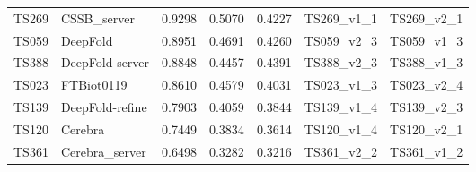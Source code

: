 \begin{table}[ht]
{\begin{tabular}{llrrrll}
TS269 & CSSB\_server & 0.9298 & 0.5070 & 0.4227 & TS269\_v1\_1 & TS269\_v2\_1 \\ 
TS059 & DeepFold & 0.8951 & 0.4691 & 0.4260 & TS059\_v2\_3 & TS059\_v1\_3 \\ 
TS388 & DeepFold-server & 0.8848 & 0.4457 & 0.4391 & TS388\_v2\_3 & TS388\_v1\_3 \\ 
TS023 & FTBiot0119 & 0.8610 & 0.4579 & 0.4031 & TS023\_v1\_3 & TS023\_v2\_4 \\ 
TS139 & DeepFold-refine & 0.7903 & 0.4059 & 0.3844 & TS139\_v1\_4 & TS139\_v2\_3 \\ 
TS120 & Cerebra & 0.7449 & 0.3834 & 0.3614 & TS120\_v1\_4 & TS120\_v2\_1 \\ 
TS361 & Cerebra\_server & 0.6498 & 0.3282 & 0.3216 & TS361\_v2\_2 & TS361\_v1\_2 \\ 
\bottomrule
\end{tabular}%
}
\end{table}
